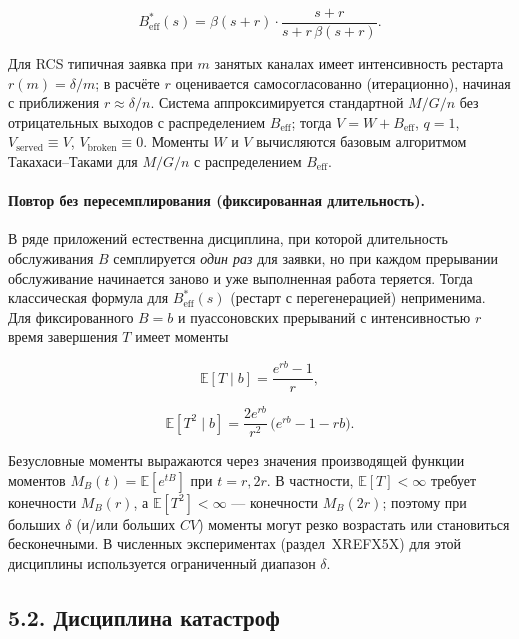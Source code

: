 \[B_{\mathrm{eff}}^{*}(s)=\beta(s+r)\cdot\frac{s+r}{s+r\,\beta(s+r)}.\]


Для RCS типичная заявка при \(m\) занятых каналах имеет интенсивность рестарта \(r(m)=\delta/m\); в расчёте \(r\) оценивается самосогласованно (итерационно), начиная с приближения \(r\approx\delta/n\). Система аппроксимируется стандартной \(M/G/n\) без отрицательных выходов с распределением \(B_{\mathrm{eff}}\); тогда \(V=W+B_{\mathrm{eff}}\), \(q=1\), \(V_{\text{served}}\equiv V\), \(V_{\text{broken}}\equiv 0\). Моменты \(W\) и \(V\) вычисляются базовым алгоритмом Такахаси--Таками для \(M/G/n\) с распределением \(B_{\mathrm{eff}}\).

\paragraph{Повтор без пересемплирования (фиксированная длительность).}
В ряде приложений естественна дисциплина, при которой длительность обслуживания \(B\) семплируется \emph{один раз} для заявки, но при каждом прерывании обслуживание начинается заново и уже выполненная работа теряется. Тогда классическая формула для \(B_{\mathrm{eff}}^{*}(s)\) (рестарт с перегенерацией) неприменима. Для фиксированного \(B=b\) и пуассоновских прерываний с интенсивностью \(r\) время завершения \(T\) имеет моменты


\[\mathbb{E}[T\mid b]=\frac{e^{rb}-1}{r},\]

\[\mathbb{E}[T^2\mid b]=\frac{2e^{rb}}{r^2}\,\bigl(e^{rb}-1-rb\bigr).\]


Безусловные моменты выражаются через значения производящей функции моментов \(M_B(t)=\mathbb{E}[e^{tB}]\) при \(t=r,2r\). В частности, \(\mathbb{E}[T]<\infty\) требует конечности \(M_B(r)\), а \(\mathbb{E}[T^2]<\infty\) --- конечности \(M_B(2r)\); поэтому при больших \(\delta\) (и/или больших \(CV\)) моменты могут резко возрастать или становиться бесконечными. В численных экспериментах (раздел~XREFX5X) для этой дисциплины используется ограниченный диапазон \(\delta\).

\subsection*{5.2. Дисциплина катастроф}
